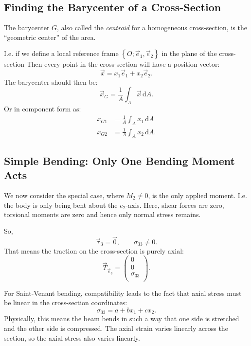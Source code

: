 
\subsection{Finding the Barycenter of a Cross-Section}
The barycenter $G$, also called the \textit{centroid} for a homogeneous cross-section, is the ``geometric center'' of the area. 

I.e. if we define a local reference frame $\left\{ O; \Vec{e}_1, \Vec{e}_2 \right\}$ in the plane of the cross-section
Then every point in the cross-section will have a position vector:
\begin{equation*}
  \Vec{x} = x_1 \Vec{e}_1 + x_2 \Vec{e}_2
.\end{equation*}
The barycenter should then be:
\begin{equation*}
  \Vec{x}_G = \frac{1}{A} \int_A \Vec{x} \, \mathrm{d}A
.\end{equation*}
Or in component form as:
\begin{align*}
  x_{G1} &= \frac{1}{A}\int_A x_1 \, \mathrm{d}A \\
  x_{G2} &= \frac{1}{A} \int_A x_2 \, \mathrm{d}A
.\end{align*}

\subsection{Simple Bending: Only One Bending Moment Acts}
We now consider the special case, where $M_2 \neq 0$, is the only applied moment.
I.e. the body is only being bent about the $e_2$-axis.
Here, shear forces are zero, torsional moments are zero and hence only normal stress remains.

So,
\begin{equation*}
  \Vec{\tau}_3 = \Vec{0}, \qquad \sigma_{33} \neq 0
.\end{equation*}
That means the traction on the cross-section is purely axial:
\begin{equation*}
  \Vec{T}_{\Vec{e}_3} = \begin{pmatrix}
    0\\
  0\\
  \sigma_{33}\\
  \end{pmatrix}
.\end{equation*}

For Saint-Venant bending, compatibility leads to the fact that axial stress must be linear in the cross-section coordinates:
\begin{equation*}
  \sigma_{33} = a + bx_1 + cx_2
.\end{equation*}
Physically, this means the beam bends in such a way that one side is stretched and the other side is compressed.
The axial strain varies linearly across the section, so the axial stress also varies linearly.

